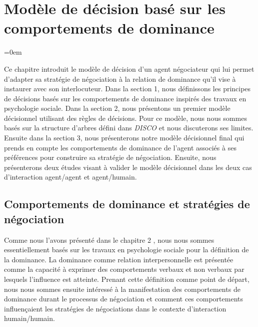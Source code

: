 \chapter{Modèle de décision basé sur les comportements de dominance}
	\label{chap:dec}
	
	\begingroup
	\parindent=0em
	\localtableofcontents 
	\clearpage
	\endgroup
	
	Ce chapitre introduit le modèle de décision d'un agent négociateur qui lui permet d'adapter sa stratégie de négociation à la relation de dominance qu'il vise à instaurer avec son interlocuteur. Dans la section 1, nous définissons les principes de décisions basés sur les comportements de dominance inspirés des travaux en psychologie sociale. Dans la section 2, nous présentons un premier modèle décisionnel utilisant des règles de décisions.  Pour ce modèle, nous nous sommes basés sur la structure d'arbres défini dans \emph{DISCO} \cite{rich09} et nous discuterons ses limites. Ensuite dans la section 3, nous présenterons notre modèle décisionnel final qui prends en compte les comportements de dominance de l'agent associés à ses préférences pour construire sa stratégie de négociation. Ensuite, nous présenterons deux études visant à valider le modèle décisionnel dans les deux cas d'interaction agent/agent et agent/humain.
	
	\section{Comportements de dominance et stratégies de négociation}
	
	\label{chap:domer}
	Comme nous l'avons présenté dans le chapitre 2  %
	, nous nous sommes essentiellement basés sur les travaux en psychologie sociale pour la définition de la dominance. 
	La dominance comme relation interpersonnelle est présentée comme la capacité à exprimer des comportements verbaux et non verbaux par lesquels  l'influence est atteinte. Prenant cette définition comme point de départ, nous nous sommes ensuite intéressé à la manifestation des comportements de dominance durant le processus de négociation et comment ces comportements influençaient les stratégies de négociations dans le contexte d'interaction humain/humain. 
	
